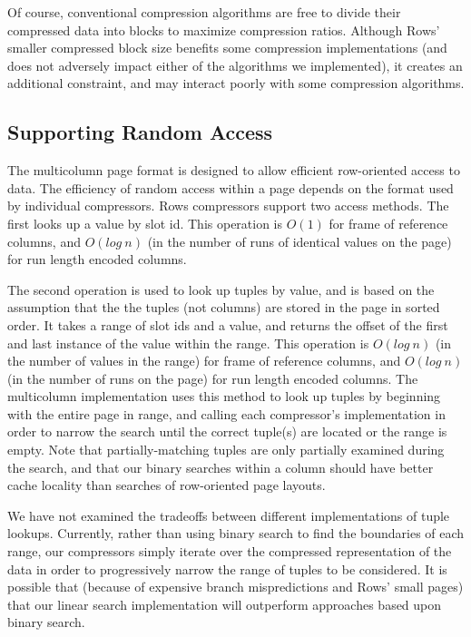 \documentclass{sig-alternate-sigmod08}
\newcommand{\rows}{Rows\xspace}
\newcommand{\rowss}{Rows'\xspace}
\begin{document}
Of course, conventional compression algorithms are free to divide
their compressed data into blocks to maximize compression ratios.
Although \rowss smaller compressed block size benefits some
compression implementations (and does not adversely impact either of
the algorithms we implemented), it creates an additional constraint,
and may interact poorly with some compression algorithms.

\subsection{Supporting Random Access}

The multicolumn page format is designed to allow efficient
row-oriented access to data.  The efficiency of random access within a
page depends on the format used by individual compressors.  \rows
compressors support two access methods.  The first looks up a value by
slot id.  This operation is $O(1)$ for frame of reference columns, and
$O(log~n)$ (in the number of runs of identical values on the page) for
run length encoded columns.

The second operation is used to look up tuples by value, and is based
on the assumption that the the tuples (not columns) are stored in the page in sorted
order.  It takes a range of slot ids and a value, and returns the
offset of the first and last instance of the value within the range.
This operation is $O(log~n)$ (in the number of values in the range)
for frame of reference columns, and $O(log~n)$ (in the number of runs
on the page) for run length encoded columns.  The multicolumn
implementation uses this method to look up tuples by beginning with
the entire page in range, and calling each compressor's implementation
in order to narrow the search until the correct tuple(s) are located
or the range is empty.  Note that partially-matching tuples are only
partially examined during the search, and that our binary searches
within a column should have better cache locality than searches of
row-oriented page layouts.

We have not examined the tradeoffs between different implementations
of tuple lookups.  Currently, rather than using binary search to find
the boundaries of each range, our compressors simply iterate over the
compressed representation of the data in order to progressively narrow
the range of tuples to be considered.  It is possible that (because of
expensive branch mispredictions and \rowss small pages) that our
linear search implementation will outperform approaches based upon
binary search.
\end{document}
